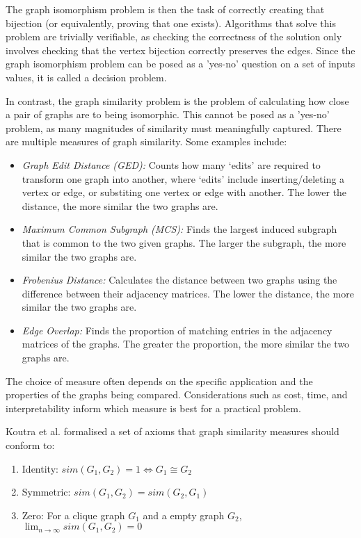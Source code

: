 The graph isomorphism problem is then the task of correctly creating that bijection (or equivalently, proving that one exists). Algorithms that solve this problem are trivially verifiable, as checking the correctness of the solution only involves checking that the vertex bijection correctly preserves the edges. Since the graph isomorphism problem can be posed as a 'yes-no' question on a set of inputs values, it is called a decision problem.

In contrast, the graph similarity problem is the problem of calculating how close a pair of graphs are to being isomorphic. This cannot be posed as a 'yes-no' problem, as many magnitudes of similarity must meaningfully captured. There are multiple measures of graph similarity. Some examples include:

\begin{itemize}
    \item \textit{Graph Edit Distance (GED):} Counts how many `edits' are required to transform one graph into another, where `edits' include inserting/deleting a vertex or edge, or substiting one vertex or edge with another. The lower the distance, the more similar the two graphs are.
    \item \textit{Maximum Common Subgraph (MCS):} Finds the largest induced subgraph that is common to the two given graphs. The larger the subgraph, the more similar the two graphs are.
    \item \textit{Frobenius Distance:} Calculates the distance between two graphs using the difference between their adjacency matrices. The lower the distance, the more similar the two graphs are.
    \item \textit{Edge Overlap:} Finds the proportion of matching entries in the adjacency matrices of the graphs. The greater the proportion, the more similar the two graphs are.\cite{QAOA_graph_sim}
\end{itemize}

The choice of measure often depends on the specific application and the properties of the graphs being compared. Considerations such as cost, time, and interpretability inform which measure is best for a practical problem.

Koutra et al. \cite{deltacon} formalised a set of axioms that graph similarity measures should conform to: 
\begin{enumerate}
    \item Identity: $sim(G_{1},G_{2})=1 \iff G_{1} \cong G_{2}$ \label{axiom:1}
    \item Symmetric:  $sim(G_{1},G_{2})=sim(G_{2},G_{1})$ \label{axiom:2}
    \item Zero: For a clique graph $G_{1}$ and a empty graph $G_{2}$, 
    $\lim_{n \to \infty} sim(G_{1},G_{2}) = 0$ \label{axiom:3}
\end{enumerate}

